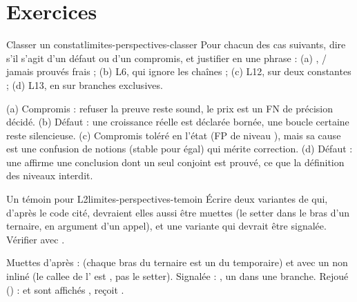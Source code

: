 \section{Exercices}
\label{sec:limites-perspectives-exercices}

\begin{exercice}{Classer un constat}{limites-perspectives-classer}
Pour chacun des cas suivants, dire s'il s'agit d'un défaut ou d'un compromis, et justifier en une phrase : (a) , / jamais prouvés frais ; (b) L6,  qui ignore les chaînes ; (c) L12,  sur deux constantes ; (d) L13,  en \Error{} sur branches exclusives.
\end{exercice}
\begin{solution}
(a) Compromis : refuser la preuve reste sound, le prix est un FN de précision décidé. (b) Défaut : une croissance réelle est déclarée bornée, une boucle certaine reste silencieuse. (c) Compromis toléré en l'état (FP de niveau \Warning{}), mais sa cause est une confusion de notions (stable pour égal) qui mérite correction. (d) Défaut : une \Error{} affirme une conclusion dont un seul conjoint est prouvé, ce que la définition des niveaux interdit.
\end{solution}

\begin{exercice}{Un témoin pour L2}{limites-perspectives-temoin}
Écrire deux variantes de  qui, d'après le code cité, devraient elles aussi être muettes (le setter dans le bras d'un ternaire, en argument d'un appel), et une variante qui devrait être signalée. Vérifier avec .
\end{exercice}
\begin{solution}
Muettes d'après  :  (chaque bras du ternaire est un  du temporaire) et  avec un  non inliné (le callee de l' est , pas le setter). Signalée : , un  dans une branche. Rejoué () :  et  sont affichés ,  reçoit .
\end{solution}

